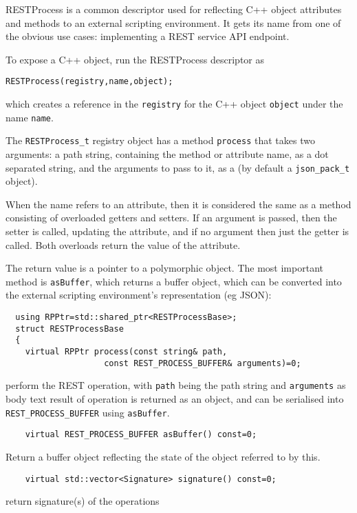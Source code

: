 
RESTProcess is a common descriptor used for reflecting C++ object
attributes and methods to an external scripting environment. It gets
its name from one of the obvious use cases: implementing a REST
service API endpoint.

To expose a C++ object, run the RESTProcess descriptor as

\begin{verbatim}
RESTProcess(registry,name,object);
\end{verbatim}
\noindent which creates a reference in the {\tt registry} for the C++ object
{\tt object} under the name {\tt name}.

The \verb+RESTProcess_t+ registry object has a method \verb+process+
that takes two arguments: a path string, containing the method or attribute name, as a dot
separated string, and the arguments to pass to it, as a  (by default a \verb+json_pack_t+ object).

When the name refers to an attribute, then it is considered the same
as a method consisting of overloaded getters and setters. If an
argument is passed, then the setter is called, updating the attribute,
and if no argument then just the getter is called. Both overloads
return the value of the attribute.

The return value is a pointer to a polymorphic object. The most
important method is \verb+asBuffer+, which returns a buffer object,
which can be converted into the external scripting environment's
representation (eg JSON):
\begin{verbatim}
  using RPPtr=std::shared_ptr<RESTProcessBase>;
  struct RESTProcessBase
  {
    virtual RPPtr process(const string& path, 
                    const REST_PROCESS_BUFFER& arguments)=0;
\end{verbatim}
perform the REST operation, with {\tt path} being the 
path string and {\tt arguments} as body text result of operation 
is returned as an object, and can be serialised into 
\verb+REST_PROCESS_BUFFER+ using {\tt asBuffer}.

\begin{verbatim}
    virtual REST_PROCESS_BUFFER asBuffer() const=0;
\end{verbatim}
Return a buffer object reflecting the state of the object referred to
by this.

\begin{verbatim}
    virtual std::vector<Signature> signature() const=0;
\end{verbatim}
return signature(s) of the operations

